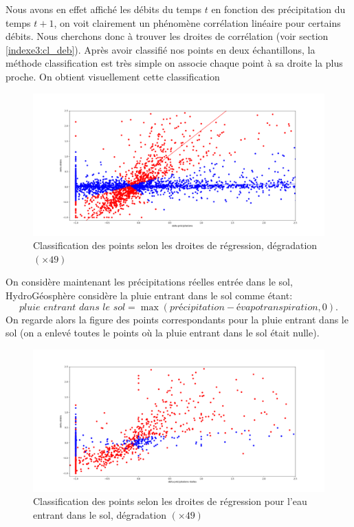 \documentclass[a4paper,11pt]{article}
\numberwithin{equation}{section}
\begin{document}
Nous avons en effet affiché les débits du temps $t$ en fonction des précipitation du temps $t+1$, on voit clairement un phénomène corrélation linéaire pour certains débits. Nous cherchons donc à trouver les droites de corrélation (voir section \ref{indexe3:cl_deb}). Après avoir classifié nos points en deux échantillons, la méthode classification est très simple on associe chaque point à sa droite la plus proche. On obtient visuellement cette classification

\begin{figure}[H]
	\label{fig-deb prec 3 classification}
	\begin{center}
		\includegraphics[scale=0.33]{classification_deb_pr.png}
	\end{center}
	\caption{Classification des points selon les droites de régression, dégradation $(\times 49)$}
\end{figure}

On considère maintenant les précipitations réelles entrée dans le sol, HydroGéosphère considère la pluie entrant dans le sol comme étant: 
\[\textit{pluie entrant dans le sol}=\max(\textit{précipitation}-\textit{évapotranspiration},0).\]
On regarde alors la figure des points correspondants pour la pluie entrant dans le sol (on a enlevé toutes le points où la pluie entrant dans le sol était nulle).

\begin{figure}[H]
	\label{fig-deb prr 3 classification}
	\begin{center}
		\includegraphics[scale=0.33]{classification_deb_prr.png}
	\end{center}
	\caption{Classification des points selon les droites de régression pour l'eau entrant dans le sol, dégradation $(\times 49)$}
\end{figure}
\end{document}

